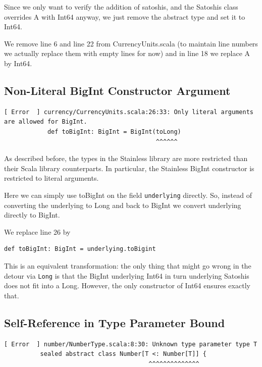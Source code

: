 \documentclass[runningheads]{llncs}
\begin{document}
Since we only want to verify the addition of satoshis, and the
Satoshis class overrides A with Int64 anyway, we just remove the
abstract type and set it to Int64.

We remove line 6 and line 22 from CurrencyUnits.scala (to maintain
line numbers we actually replace them with empty lines for now) and in
line 18 we replace A by Int64.


\subsection{Non-Literal BigInt Constructor Argument}


\begin{lstlisting}[style=stainless]
[ Error  ] currency/CurrencyUnits.scala:26:33: Only literal arguments are allowed for BigInt.
            def toBigInt: BigInt = BigInt(toLong)
                                          ^^^^^^
\end{lstlisting}

As described before, the types in the Stainless library are more
restricted than their Scala library counterparts. In particular, the
Stainless BigInt constructor is restricted to literal arguments.


Here we can simply use toBigInt on the field \texttt{underlying}
directly.  So, instead of converting the underlying to Long and back
to BigInt we convert underlying directly to BigInt.

We replace line 26 by
\begin{lstlisting}[style=scala]
def toBigInt: BigInt = underlying.toBigint
\end{lstlisting}

This is an equivalent transformation: the only thing that might go
wrong in the detour via \texttt{Long} is that the BigInt underlying
Int64 in turn underlying Satoshis does not fit into a Long. However,
the only constructor of Int64 ensures exactly that.

\subsection{Self-Reference in Type Parameter Bound}

\begin{lstlisting}[style=stainless]
[ Error  ] number/NumberType.scala:8:30: Unknown type parameter type T
          sealed abstract class Number[T <: Number[T]] {
                                        ^^^^^^^^^^^^^^
\end{lstlisting}
\end{document}
